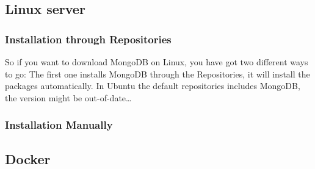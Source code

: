 \subsection{Linux server}

\subsubsection{Installation through Repositories}
So if you want to download MongoDB on Linux, you have got two different ways to go:
The first one installs MongoDB through the Repositories, it will install the packages automatically. 
In Ubuntu the default repositories includes MongoDB, the version might be out-of-date\dots


\subsubsection{Installation Manually}



\subsection{Docker}


\parencite{Mongo-Installation}

\parencite[p. ]{Subramanian2019}